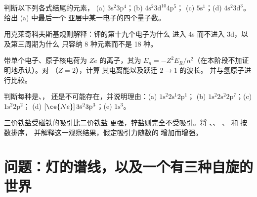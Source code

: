 \begin{exercise}[$\star\star$]\label{exo:b1:quantum-numbers:8}
判断以下列各式结尾的元素，
(a) $3\text{s}^2 3\text{p}^4$；(b) $4\text{s}^2 3\text{d}^{10} 4\text{p}^5$；
(c) $5\text{s}^1$；(d) $4\text{s}^2 3\text{d}^3$。给出 (a) 中最后一个
亚层中某一电子的四个量子数。
\end{exercise}

\begin{exercise}[$\star\star$]\label{exo:b1:quantum-numbers:9}
用克莱奇科夫斯基规则解释：钾的第十九个电子为什么
进入 4s 而不进入 3d，以及第三周期为什么
只容纳 8 种元素而不是 18 种。
\end{exercise}

\begin{exercise}[$\star\star\star$]\label{exo:b1:quantum-numbers:10}
带单个电子、原子核电荷为 $Ze$ 的离子，其为
$E_n = -Z^2 E_R/n^2$（在本阶段不加证明地承认）。对 （$Z = 2$），计算
其电离能以及跃迁 $2 \to 1$ 的波长。
并与氢原子进行比较。
\end{exercise}

\begin{exercise}[$\star\star\star$]\label{exo:b1:quantum-numbers:11}
判断每种是、，
还是不可能存在，并说明理由：(a) $1\text{s}^2 2\text{s}^1 2\text{p}^1$；
(b) $1\text{s}^2 2\text{s}^2 2\text{p}^7$；(c) $1\text{s}^2 2\text{p}^2$；
(d) $[\ce{Ne}]\,3\text{s}^2 3\text{p}^3$；(e) $1\text{s}^3$。
\end{exercise}

\begin{exercise}[$\star\star\star$]\label{exo:b1:quantum-numbers:12}
三价铁盐受磁铁的吸引比二价铁盐
更强，锌盐则完全不受吸引。将 、、
、 和  按数排序，
并解释这一观察结果，假定吸引力随数的
增加而增强。
\end{exercise}

\section{问题：灯的谱线，以及一个有三种自旋的世界}

